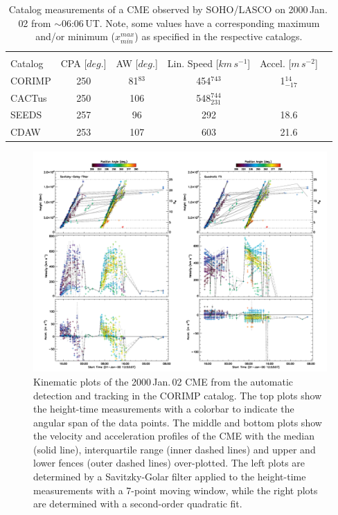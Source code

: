 \documentclass[referee,a4paper,12pt,traditabstract]{swsc}
\begin{document}
\begin{linenumbers}
\begin{table}[h]
\begin{tabular}{l*{4}{c}r}
\multicolumn{5}{c}{} \\
Catalog              & CPA [$deg.$] & AW [$deg.$] & Lin. Speed [$km\,s^{-1}$] & Accel. [$m\,s^{-2}$]  \\
\hline
CORIMP         & 250   & 81$^{83}$   & 454$^{743}$ &  1$_{-17}^{14}$  \\
CACTus          & 250 & 106 & 548$_{231}^{744}$ &     \\
SEEDS        & 257 & 96 & 292 & 18.6  \\
CDAW     & 253 & 107 & 603 & 21.6 \\
\end{tabular}
\caption{Catalog measurements of a CME observed by SOHO/LASCO on 2000\,Jan.\,02 from $\sim$06:06\,UT. Note, some values have a corresponding maximum and/or minimum ($x_{min}^{max}$) as specified in the respective catalogs.}
\label{table_20000102}
\end{table}

\begin{figure}[t]
\centerline{\includegraphics[width=\linewidth]{images/20000102_corimp_kins.pdf}}
\caption{Kinematic plots of the 2000\,Jan.\,02 CME from the automatic detection and tracking in the CORIMP catalog. The top plots show the height-time measurements with a colorbar to indicate the angular span of the data points. The middle and bottom plots show the velocity and acceleration profiles of the CME with the median (solid line), interquartile range (inner dashed lines) and upper and lower fences (outer dashed lines) over-plotted. The left plots are determined by a Savitzky-Golar filter applied to the height-time measurements with a 7-point moving window, while the right plots are determined with a second-order quadratic fit.}
\label{20000102_corimp_kins}
\end{figure}


\end{linenumbers}
\end{document}
